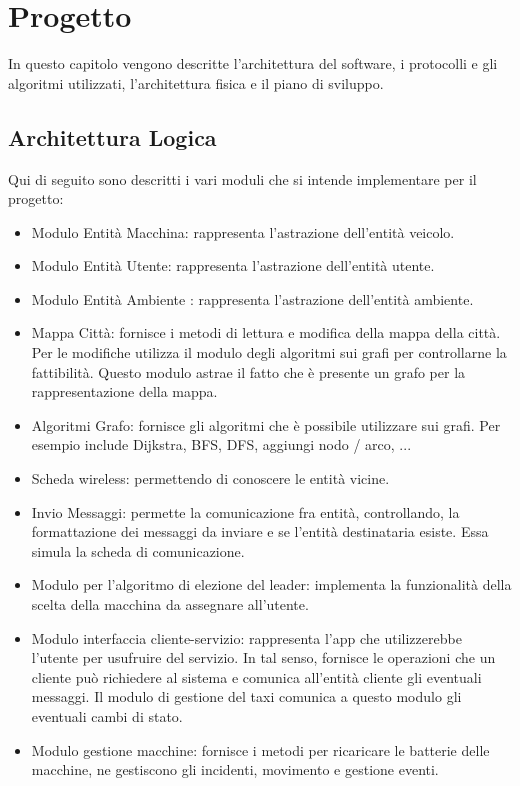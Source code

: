 
\chapter{Progetto} \label{progetto}

In questo capitolo vengono descritte l'architettura del software, i protocolli e gli algoritmi utilizzati, l'architettura fisica e il piano di sviluppo.

\section{Architettura Logica}

Qui di seguito sono descritti i vari moduli che si intende implementare per il progetto:

\begin{itemize} \label{modules}
	\item Modulo Entità Macchina: rappresenta l'astrazione dell'entità veicolo.
	\item Modulo Entità Utente: rappresenta l'astrazione dell'entità utente.
	\item Modulo Entità Ambiente : rappresenta l'astrazione dell'entità ambiente.
	\item Mappa Città: fornisce i metodi di lettura e modifica della mappa della città. Per le modifiche utilizza il modulo degli algoritmi sui grafi per controllarne la fattibilità. Questo modulo astrae il fatto che è presente un grafo per la rappresentazione della mappa.
	\item Algoritmi Grafo: fornisce gli algoritmi che è possibile utilizzare sui grafi. Per esempio include Dijkstra, BFS, DFS, aggiungi nodo / arco, ...
	\item Scheda wireless: permettendo di conoscere le entità vicine.
	\item Invio Messaggi: permette la comunicazione fra entità, controllando, la formattazione dei messaggi da inviare e se l'entità destinataria esiste. Essa simula la scheda di comunicazione.
	\item Modulo per l'algoritmo di elezione del leader: implementa la funzionalità della scelta della macchina da assegnare all'utente.
	\item Modulo interfaccia cliente-servizio: rappresenta l'app che utilizzerebbe l'utente per usufruire del servizio. In tal senso, fornisce le operazioni che un cliente può richiedere al sistema e comunica all'entità cliente gli eventuali messaggi. Il modulo di gestione del taxi comunica a questo modulo gli eventuali cambi di stato.
	\item Modulo gestione macchine: fornisce i metodi per ricaricare le batterie delle macchine, ne gestiscono gli incidenti, movimento e gestione eventi.
\end{itemize}

